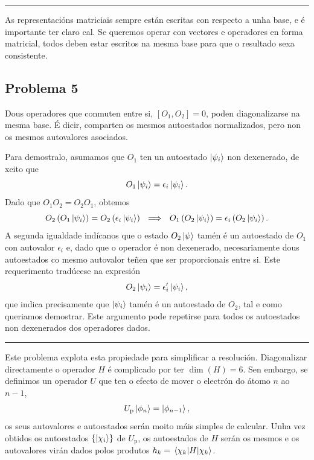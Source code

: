 \documentclass[a4paper,12pt]{article}
\begin{document}
\begin{center} \hrule \end{center}

As representacións matriciais sempre están escritas con respecto a unha base, e é importante ter claro cal. Se queremos operar con vectores e operadores en forma matricial, todos deben estar escritos na mesma base para que o resultado sexa consistente.

\subsection*{Problema 5}

Dous operadores que conmuten entre si, $[O_1,O_2]=0$, poden diagonalizarse na mesma base. É dicir, comparten os mesmos autoestados normalizados, pero non os mesmos autovalores asociados. 

Para demostralo, asumamos que $O_1$ ten un autoestado $\ket{\psi_i}$ non dexenerado, de xeito que
\begin{equation}
	O_1 \ket{\psi_i} = \epsilon_i \ket{\psi_i}.
\end{equation} 
\noindent
Dado que $O_1 O_2 = O_2 O_1$, obtemos
\begin{equation}
	O_2 \left( O_1 \ket{\psi_i} \right) = O_2 \left( \epsilon_i \ket{\psi_i} \right) ~~ \Longrightarrow ~~ O_1 \left( O_2 \ket{\psi_i}\right) = \epsilon_i \left( O_2 \ket{\psi_i} \right).
\end{equation}
\noindent
A segunda igualdade indícanos que o estado $O_2 \ket{\psi}$ tamén é un autoestado de $O_1$ con autovalor $\epsilon_i$ e, dado que o operador é non dexenerado, necesariamente dous autoestados co mesmo autovalor teñen que ser proporcionais entre si. Este requerimento tradúcese na expresión
\begin{equation}
	O_2 \ket{\psi_i} = \epsilon'_i \ket{\psi_i},
\end{equation}
\noindent
que indica precisamente que $\ket{\psi_i}$ tamén é un autoestado de $O_2$, tal e como queriamos demostrar. Este argumento pode repetirse para todos os autoestados non dexenerados dos operadores dados.

\begin{center} \hrule \end{center}

Este problema explota esta propiedade para simplificar a resolución. Diagonalizar directamente o operador $H$ é complicado por ter $\dim(H)=6$. Sen embargo, se definimos un operador $U$ que ten o efecto de mover o electrón do átomo $n$ ao $n-1$,
\begin{equation}
	U_\mathrm{p}\ket{\phi_n} = \ket{\phi_{n-1}},
\end{equation}
\noindent
os seus autovalores e autoestados serán moito máis simples de calcular. Unha vez obtidos os autoestados $\{\ket{\chi_i}\}$ de $U_\mathrm{p}$, os autoestados de $H$ serán os mesmos e os autovalores virán dados polos produtos $h_k = \mel{\chi_k}{H}{\chi_k}$.
\end{document}
